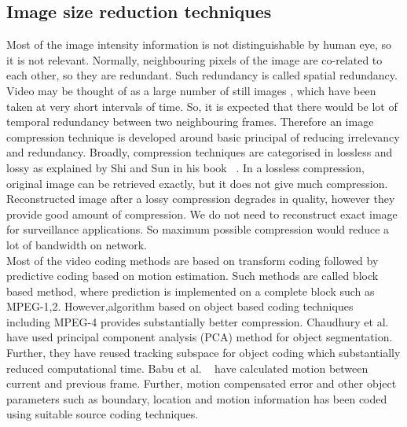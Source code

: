 \subsection{Image size reduction techniques}
\indent Most of the image intensity information is not distinguishable
by human eye, so it is not relevant. Normally, neighbouring pixels of
the image are co-related to each other, so they are redundant. Such
redundancy is called spatial redundancy. Video may be thought of as a
large number of still images , which have been taken at very short
intervals of time. So, it is expected that there would be lot of
temporal redundancy between two neighbouring frames.  Therefore an image
compression technique is developed around basic principal of reducing
irrelevancy and redundancy. Broadly, compression techniques are
categorised in lossless and lossy as explained by Shi and Sun in his
book ~\cite{6}. In a lossless compression, original image can be
retrieved exactly, but it does not give much compression.  Reconstructed
image after a lossy compression degrades in quality, however they
provide good amount of compression. We do not need to reconstruct exact
image for surveillance applications. So maximum possible compression
would reduce a lot of bandwidth on network.\\

\indent Most of the video coding methods are based on transform coding
followed by predictive coding based on motion estimation. Such methods
are called block based method, where prediction is implemented on a
complete block such as  MPEG-1,2. However,algorithm based
on object based coding techniques ~\cite{7, 8} including MPEG-4 provides
substantially better compression. Chaudhury et al. ~\cite{7} have used
principal component analysis (PCA) method for object
segmentation. Further, they have reused tracking subspace for object
coding which substantially reduced computational time. Babu et al.
~\cite{8} have calculated motion between current and previous frame.
Further, motion compensated error and other object parameters such as
boundary, location and motion information has been coded using suitable
source coding techniques. 
